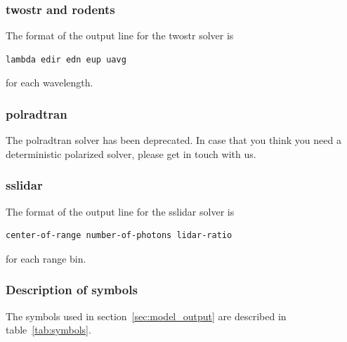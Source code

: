 \subsubsection{twostr and rodents}
The format of the output line for the twostr
solver is
\begin{Verbatim}[fontsize=\footnotesize, frame=single]  
lambda edir edn eup uavg
\end{Verbatim}
for each wavelength.


\subsubsection{polradtran}
The polradtran solver has been deprecated.
In case that you think you need a deterministic polarized solver, please get in touch with us.


\subsubsection{sslidar}
\label{subsubsec:sslidar-output}

The format of the output line for the sslidar
solver is
\begin{Verbatim}[fontsize=\footnotesize, frame=single]  
center-of-range number-of-photons lidar-ratio
\end{Verbatim}
for each range bin.

\subsubsection{Description of symbols}

The symbols used in section~\ref{sec:model_output} are described in
table~\ref{tab:symbols}.

